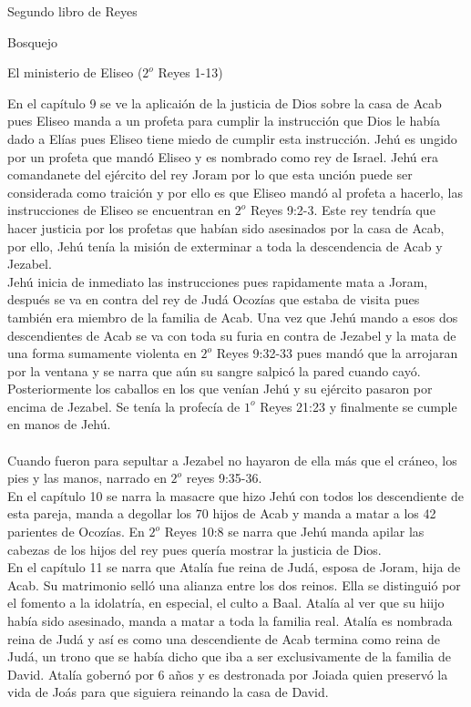 \begin{section}{Segundo libro de Reyes}
\begin{subsection}{Bosquejo}
\begin{subsubsection}{El ministerio de Eliseo ($2^{o}$ Reyes 1-13)}
\begin{enumerate}
En el capítulo 9 se ve la aplicaión de la justicia de Dios sobre la casa de Acab pues Eliseo manda a un profeta para cumplir la instrucción que Dios le había dado a Elías pues Eliseo tiene miedo de cumplir esta instrucción. Jehú es ungido por un profeta que mandó Eliseo y es nombrado como rey de Israel. Jehú era comandanete del ejército del rey Joram por lo que esta unción puede ser considerada como traición y por ello es que Eliseo mandó al profeta a hacerlo, las instrucciones de Eliseo se encuentran en $2^{o}$ Reyes 9:2-3. Este rey tendría que hacer justicia por los profetas que habían sido asesinados por la casa de Acab, por ello, Jehú tenía la misión de exterminar a toda la descendencia de Acab y Jezabel.\\
Jehú inicia de inmediato las instrucciones pues rapidamente mata a Joram, después se va en contra del rey de Judá Ocozías que estaba de visita pues también era miembro de la familia de Acab. Una vez que Jehú mando a esos dos descendientes de Acab se va con toda su furia en contra de Jezabel y la mata de una forma sumamente violenta en $2^{o}$ Reyes 9:32-33 pues mandó que la arrojaran por la ventana y se narra que aún su sangre salpicó la pared cuando cayó. Posteriormente los caballos en los que venían Jehú y su ejército pasaron por encima de Jezabel. Se tenía la profecía de $1^{o}$ Reyes 21:23 y finalmente se cumple en manos de Jehú.\\ \\
Cuando fueron para sepultar a Jezabel no hayaron de ella más que el cráneo, los pies y las manos, narrado en $2^{o}$ reyes 9:35-36.\\
En el capítulo 10 se narra la masacre que hizo Jehú con todos los descendiente de esta pareja, manda a degollar los 70 hijos de Acab y manda a matar a los 42 parientes de Ocozías. En $2^{o}$ Reyes 10:8 se narra que Jehú manda apilar las cabezas de los hijos del rey pues quería mostrar la justicia de Dios.\\
En el capítulo 11 se narra que Atalía fue reina de Judá, esposa de Joram, hija de Acab. Su matrimonio selló una alianza entre los dos reinos. Ella se distinguió por el fomento a la idolatría, en especial, el culto a Baal. Atalía al ver que su hiijo había sido asesinado, manda a matar a toda la familia real. Atalía es nombrada reina de Judá y así es como una descendiente de Acab termina como reina de Judá, un trono que se había dicho que iba a ser exclusivamente de la familia de David. Atalía gobernó por 6 años y es destronada por Joiada quien preservó la vida de Joás para que siguiera reinando la casa de David.\\

\end{enumerate}
\end{subsubsection}
\end{subsection}
\end{section}
